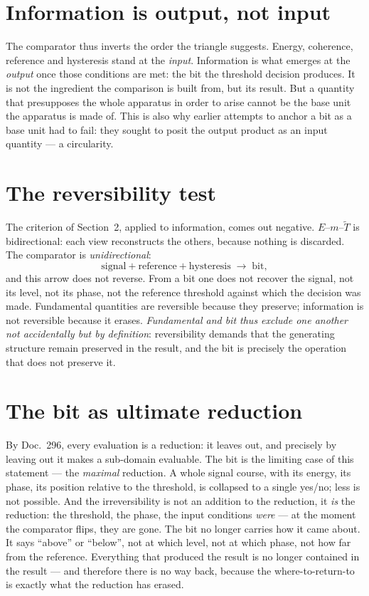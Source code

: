 \section{Information is output, not input}

The comparator thus inverts the order the triangle suggests. Energy, coherence,
reference and hysteresis stand at the \emph{input}. Information is what emerges
at the \emph{output} once those conditions are met: the bit the threshold
decision produces. It is not the ingredient the comparison is built from, but its
result. But a quantity that presupposes the whole apparatus in order to arise
cannot be the base unit the apparatus is made of. This is also why earlier
attempts to anchor a bit as a base unit had to fail: they sought to posit the
output product as an input quantity --- a circularity.

\section{The reversibility test}

The criterion of Section~2, applied to information, comes out negative.
$E$--$m$--$\tilde{T}$ is bidirectional: each view reconstructs the others, because
nothing is discarded. The comparator is \emph{unidirectional}:
\begin{equation}
  \text{signal} + \text{reference} + \text{hysteresis}
  \;\longrightarrow\; \text{bit},
\end{equation}
and this arrow does not reverse. From a bit one does not recover the signal, not
its level, not its phase, not the reference threshold against which the decision
was made. Fundamental quantities are reversible because they preserve;
information is not reversible because it erases. \emph{Fundamental and bit thus
exclude one another not accidentally but by definition}: reversibility demands
that the generating structure remain preserved in the result, and the bit is
precisely the operation that does not preserve it.

\section{The bit as ultimate reduction}

By Doc.~296, every evaluation is a reduction: it leaves out, and precisely by
leaving out it makes a sub-domain evaluable. The bit is the limiting case of this
statement --- the \emph{maximal} reduction. A whole signal course, with its
energy, its phase, its position relative to the threshold, is collapsed to a
single yes/no; less is not possible. And the irreversibility is not an addition
to the reduction, it \emph{is} the reduction: the threshold, the phase, the input
conditions \emph{were} --- at the moment the comparator flips, they are gone. The
bit no longer carries how it came about. It says \enquote{above} or
\enquote{below}, not at which level, not at which phase, not how far from the
reference. Everything that produced the result is no longer contained in the
result --- and therefore there is no way back, because the where-to-return-to is
exactly what the reduction has erased.

